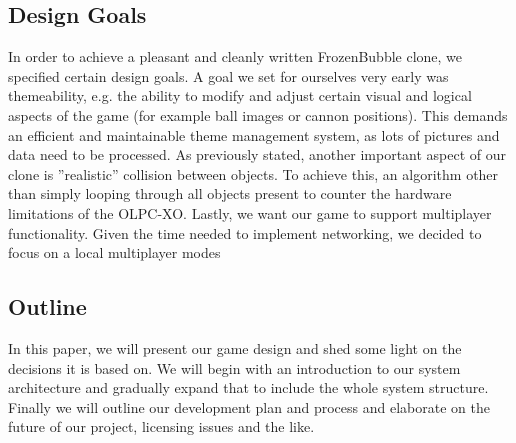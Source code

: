 \subsection{Design Goals}
In order to achieve a pleasant and cleanly written FrozenBubble clone, we specified certain design goals.
A goal we set for ourselves very early was themeability, e.g. the ability to modify and adjust certain visual and logical aspects of the game (for example ball images or cannon positions). This demands an efficient and maintainable theme management system, as lots of pictures and data need to be processed.
As previously stated, another important aspect of our clone is ''realistic'' collision between objects. To achieve this, an algorithm other than simply looping through all objects present to counter the hardware limitations of the OLPC-XO.
Lastly, we want our game to support multiplayer functionality. Given the time needed to implement networking, we decided to focus on a local multiplayer modes 

%
\subsection{Outline}
In this paper, we will present our game design and shed some light on the decisions 
it is based on. We will begin with an introduction to our system architecture and 
gradually expand that to include the whole system structure.\\
Finally we will outline our development plan and process and elaborate on the 
future of our project, licensing issues and the like.
%
